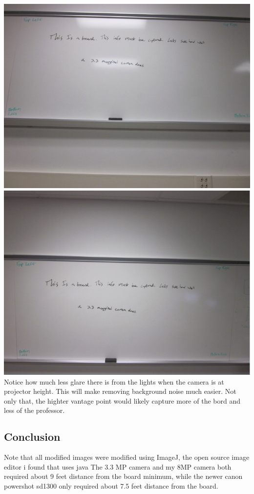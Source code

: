 \documentclass[]{article}
\begin{document}
		\includegraphics{images/TableLevelCanon.jpg} \\
		\includegraphics{images/ProjectorHeightCanon.jpg} \\
		Notice how much less glare there is from the lights when the camera is at projector height. This will make removing background noise much easier. Not only that, the highter vantage point would likely capture more of the bord and less of the professor.\\
		
	\subsection{Conclusion}
		Note that all modified images were modified using ImageJ, the open source image editor i found that uses java
		The 3.3 MP camera and my 8MP camera both required about 9 feet distance from the board minimum, while the newer canon powershot sd1300 only required about 7.5 feet distance from the board.\\
		
\end{document}
